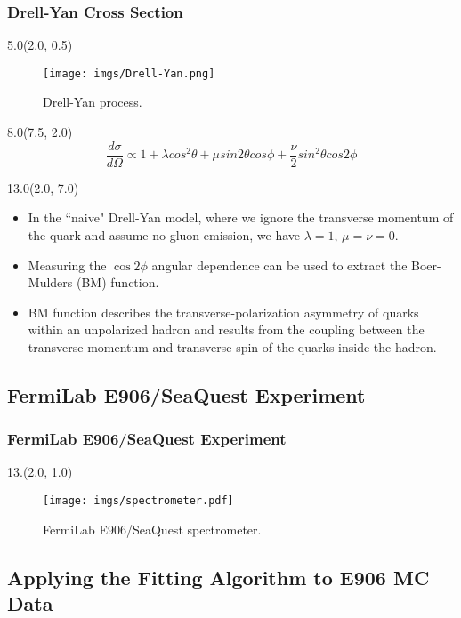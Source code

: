 \documentclass[12pt, xcolor={dvipsnames}, aspectratio = 169, sans,mathserif]{beamer}
\newenvironment{List}[2]
{\begin{textblock}{#1}#2
\begin{itemize}}
{\end{itemize}
\end{textblock}}
\newenvironment{Pic}[2]
{\begin{textblock}{#1}#2
\begin{figure}}
{\end{figure}
\end{textblock}}
\begin{document}
\begin{frame}
\frametitle{Drell-Yan Cross Section}

\begin{Pic}{5.0}{(2.0, 0.5)}
\texttt{[image: imgs/Drell-Yan.png]}
\caption{Drell-Yan process.}
\end{Pic}

\begin{textblock}{8.0}(7.5, 2.0)
\begin{equation*}
\frac{d\sigma}{d\Omega} \propto 1 + \lambda cos^{2}\theta + \mu sin2\theta cos\phi + \frac{\nu}{2} sin^{2}\theta cos2\phi
\end{equation*}
\end{textblock}

\begin{List}{13.0}{(2.0, 7.0)}

  \item In the ``naive" Drell-Yan model, where we ignore the transverse momentum of the quark and assume no gluon emission,
  we have $\lambda = 1$, $\mu = \nu = 0$.

  \item Measuring the $\cos 2\phi$ angular dependence can be used to extract the Boer-Mulders (BM) function.

  \item BM function describes the transverse-polarization asymmetry of quarks within an unpolarized hadron and results
  from the coupling between the transverse momentum and transverse spin of the quarks inside the hadron.

\end{List}

\end{frame}


\subsection{FermiLab E906/SeaQuest Experiment}

\begin{frame}
\frametitle{FermiLab E906/SeaQuest Experiment}

\begin{Pic}{13.}{(2.0, 1.0)}
\texttt{[image: imgs/spectrometer.pdf]}
\caption{FermiLab E906/SeaQuest spectrometer.}
\end{Pic}

\end{frame}

\subsection{Applying the Fitting Algorithm to E906 MC Data}
\end{document}
